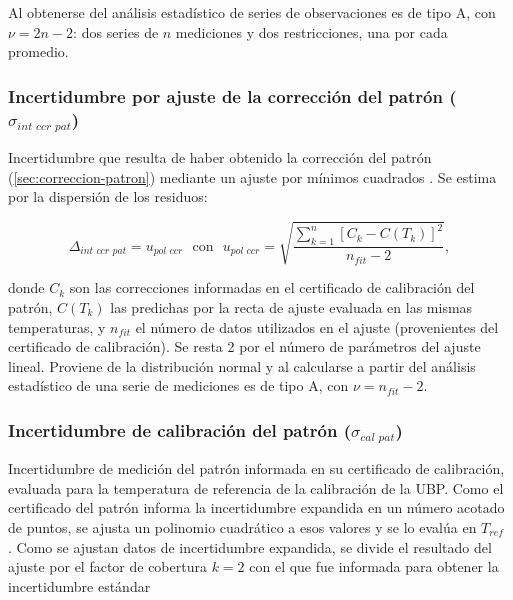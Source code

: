 Al obtenerse del análisis estadístico de series de observaciones es de tipo A, con $\nu = 2n-2$: dos series de $n$ mediciones y dos restricciones, una por cada promedio.


\subsubsection{Incertidumbre por ajuste de la corrección del patrón ($\sigma_{\textit{int ccr pat}}$)}

Incertidumbre que resulta de haber obtenido la corrección del patrón (\cref{sec:correccion-patron}) mediante un ajuste por mínimos cuadrados \autocite{NW2.12,GUMH.3}. Se estima por la dispersión de los residuos:

\begin{equation}
    \Delta_{\textit{int ccr pat}} = u_{\textit{pol ccr}} \ \ \ \text{con} \ \ \ u_{\textit{pol ccr}} = \sqrt{\frac{\sum_{k=1}^{n}\left[ C_k - C(T_k) \right]^2}{n_{fit}-2}},
\end{equation}

donde $C_k$ son las correcciones informadas en el certificado de calibración del patrón, $C(T_k)$ las predichas por la recta de ajuste evaluada en las mismas temperaturas, y $n_{fit}$ el número de datos utilizados en el ajuste (provenientes del certificado de calibración). Se resta 2 por el número de parámetros del ajuste lineal. Proviene de la distribución normal y al calcularse a partir del análisis estadístico de una serie de mediciones es de tipo A, con $\nu = n_{fit}-2$.


\subsubsection{Incertidumbre de calibración del patrón ($\sigma_{\textit{cal pat}}$)}

Incertidumbre de medición del patrón informada en su certificado de calibración, evaluada para la temperatura de referencia de la calibración de la UBP. Como el certificado del patrón informa la incertidumbre expandida en un número acotado de puntos, se ajusta un polinomio cuadrático a esos valores y se lo evalúa en $T_{ref}$ \cite{NW2.12}. Como se ajustan datos de incertidumbre expandida, se divide el resultado del ajuste por el factor de cobertura $k=2$ con el que fue informada para obtener la incertidumbre estándar \cite{GUM4.3}

